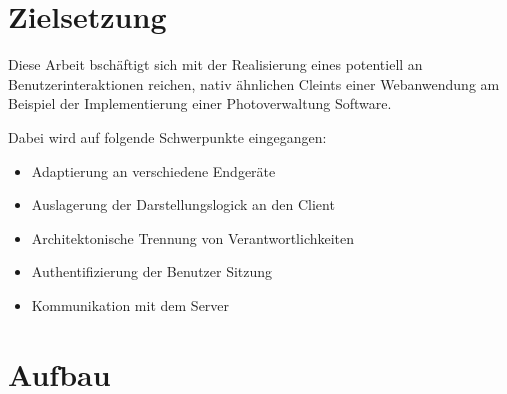 \newpage

\section{Zielsetzung}
\label{sec:zielsetzung}


Diese Arbeit bschäftigt sich mit der Realisierung eines potentiell an Benutzerinteraktionen reichen, nativ ähnlichen Cleints einer Webanwendung am Beispiel der Implementierung einer Photoverwaltung Software.

Dabei wird auf folgende Schwerpunkte eingegangen:
\begin{itemize}
\item Adaptierung an verschiedene Endgeräte
\item Auslagerung der Darstellungslogick an den Client
\item Architektonische Trennung von Verantwortlichkeiten
\item Authentifizierung der Benutzer Sitzung
\item Kommunikation mit dem Server
\end{itemize}


\section{Aufbau}

\newpage
